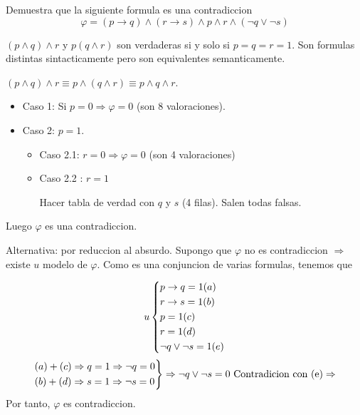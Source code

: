 \begin{example}
	Demuestra que la siguiente formula es una contradiccion
	\[
		\varphi = (p \rightarrow q) \wedge (r \rightarrow s) \wedge p \wedge  r \wedge (\neg q \vee \neg s )
	\]

	\((p \wedge  q) \wedge  r \) y \(p (q \wedge r )\) son verdaderas si y solo si \(p = q = r = 1 \). Son formulas distintas sintacticamente pero son equivalentes semanticamente.

	\((p \wedge  q) \wedge r \equiv p \wedge (q \wedge  r) \equiv  p \wedge  q \wedge  r \).

	\begin{itemize}
		\item Caso 1: Si \(p = 0 \Rightarrow \varphi = 0\) (son 8 valoraciones).
		\item Caso 2:  \(p = 1 \).
		      \begin{itemize}
			      \item Caso 2.1: \(r = 0 \Rightarrow \varphi = 0 \) (son 4 valoraciones)
			      \item Caso 2.2 : \(r = 1 \)

			            Hacer tabla de verdad con \(q \) y \(s \) (4 filas). Salen todas falsas.

		      \end{itemize}
	\end{itemize}
	Luego \(\varphi \) es una contradiccion.

	Alternativa: por reduccion al absurdo. Supongo que \(\varphi\) no es contradiccion \(\Rightarrow \) existe \(u \) modelo de \(\varphi\). Como es una conjuncion de varias formulas, tenemos que

	\[
		u \begin{dcases}
			p \rightarrow q = 1 (a) \\
			r \rightarrow s = 1 (b) \\
			p = 1              (c)  \\
			r = 1              (d)  \\
			\neg q \vee \neg s = 1 (e)
		\end{dcases}
	\]
	\[
		\begin{rcases}
			(a) + (c) \Rightarrow q = 1 \Rightarrow \neg q = 0 \\
			(b) + (d) \Rightarrow s = 1 \Rightarrow \neg s = 0
		\end{rcases} \Rightarrow \neg q \vee \neg s = 0 \text{ Contradicion con (e)} \Rightarrow
	\]
	Por tanto, \(\varphi\) es contradiccion.
\end{example}

